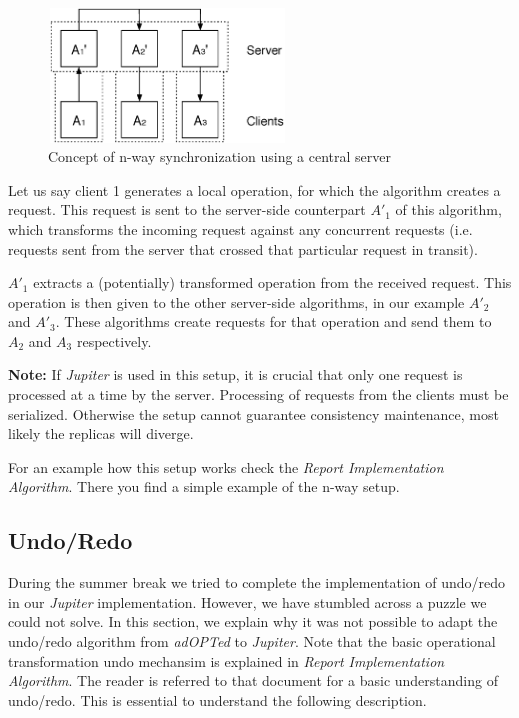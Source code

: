 \begin{figure}[htb]
 \centering
 \includegraphics[width=6.31cm,height=3.56cm]{../images/finalreport/algorithm_nway-details.eps}
 \caption{Concept of n-way synchronization using a central server}
 \label{fig:algorithm.nway-details}
\end{figure}

Let us say client 1 generates a local operation, for which the algorithm
creates a request. This request is sent to the server-side counterpart $A'_1$ of
this algorithm, which transforms the incoming request against any concurrent
requests (i.e. requests sent from the server that crossed that particular 
request in transit).

$A'_1$ extracts a (potentially) transformed operation from the received 
request. This operation is then given to the other server-side algorithms,
in our example $A'_2$ and $A'_3$. These algorithms create
requests for that operation and send them to $A_2$ and $A_3$ respectively.

\textbf{Note:} If \emph{Jupiter} is used in this setup, it is crucial that
only one request is processed at a time by the server. Processing of
requests from the clients must be serialized. Otherwise the setup cannot
guarantee consistency maintenance, most likely the replicas will diverge.

For an example how this setup works check the 
\emph{Report Implementation Algorithm}. There you find a simple example
of the n-way setup.


\subsection{Undo/Redo}
\label{sect:algorithm.undoredo}
During the summer break we tried to complete the implementation of undo/redo
in our \emph{Jupiter} implementation. However, we have stumbled across
a puzzle we could not solve. In this section, we explain why it was
not possible to adapt the undo/redo algorithm from \emph{adOPTed} to \emph{Jupiter}. Note that the basic operational transformation undo mechansim is explained in \emph{Report Implementation Algorithm}. The reader is referred to that document for a basic understanding of undo/redo. This is essential to understand the following description.

